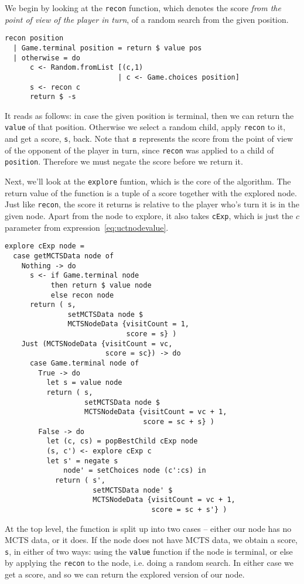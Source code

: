 We begin by looking at the \texttt{recon} function, which denotes the score \emph{from the point of view of the player in turn}, of a random search from the given position.
\begin{minipage}{\linewidth}
\begin{lstlisting}[frame=single]
recon position
  | Game.terminal position = return $ value pos
  | otherwise = do
      c <- Random.fromList [(c,1)
                           | c <- Game.choices position]
      s <- recon c
      return $ -s
\end{lstlisting}
\end{minipage}
It reads as follows: in case the given position is terminal, then we can return the \texttt{value} of that position. Otherwise we select a random child, apply \texttt{recon} to it, and get a score, \texttt{s}, back.
Note that $\texttt{s}$ represents the score from the point of view of the opponent of the player in turn, since \texttt{recon} was applied to a child of \texttt{position}. Therefore we must negate the score before we return it.

Next, we'll look at the \texttt{explore} funtion, which is the core of the algorithm. The return value of the function is a tuple of a score together with the explored node. Just like \texttt{recon}, the score it returns is relative to the player who's turn it is in the given node. Apart from the node to explore, it also takes \texttt{cExp}, which is just the $c$ parameter from expression~\ref{eq:uctnodevalue}.

\begin{minipage}{\linewidth}
\begin{lstlisting}[frame=single]
explore cExp node = 
  case getMCTSData node of
    Nothing -> do
      s <- if Game.terminal node
           then return $ value node
           else recon node
      return ( s,
               setMCTSData node $
               MCTSNodeData {visitCount = 1,
                             score = s} )
    Just (MCTSNodeData {visitCount = vc,
                        score = sc}) -> do
      case Game.terminal node of
        True -> do
          let s = value node
          return ( s,
                   setMCTSData node $
                   MCTSNodeData {visitCount = vc + 1,
                                 score = sc + s} )
        False -> do
          let (c, cs) = popBestChild cExp node
          (s, c') <- explore cExp c
          let s' = negate s
              node' = setChoices node (c':cs) in
            return ( s',
                     setMCTSData node' $
                     MCTSNodeData {visitCount = vc + 1,
                                   score = sc + s'} )
\end{lstlisting}
\end{minipage}
At the top level, the function is split up into two cases -- either our node has no MCTS data, or it does.
If the node does not have MCTS data, we obtain a score, \texttt{s}, in either of two ways: using the \texttt{value} function if the node is terminal, or else by applying the \texttt{recon} to the node, i.e. doing a random search.
In either case we get a score, and so we can return the explored version of our node.

